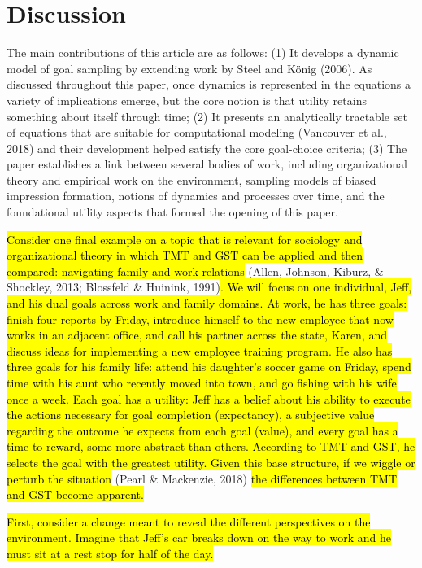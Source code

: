\documentclass[english,,man]{apa6}
\theoremstyle{definition}
\theoremstyle{definition}
\theoremstyle{definition}
\theoremstyle{remark}
\begin{document}
\hypertarget{discussion}{%
\section{Discussion}\label{discussion}}

The main contributions of this article are as follows: (1) It develops a
dynamic model of goal sampling by extending work by Steel and König
(2006). As discussed throughout this paper, once dynamics is represented
in the equations a variety of implications emerge, but the core notion
is that utility retains something about itself through time; (2) It
presents an analytically tractable set of equations that are suitable
for computational modeling (Vancouver et al., 2018) and their
development helped satisfy the core goal-choice criteria; (3) The paper
establishes a link between several bodies of work, including
organizational theory and empirical work on the environment, sampling
models of biased impression formation, notions of dynamics and processes
over time, and the foundational utility aspects that formed the opening
of this paper.

\hl{Consider one final example on a topic that is relevant for sociology and organizational theory in which TMT and GST can be applied and then compared: navigating family and work relations}
(Allen, Johnson, Kiburz, \& Shockley, 2013; Blossfeld \& Huinink,
1991)\hl{. We will focus on one individual, Jeff, and his dual goals across work and family domains. At work, he has three goals: finish four reports by Friday, introduce himself to the new employee that now works in an adjacent office, and call his partner across the state, Karen, and discuss ideas for implementing a new employee training program. He also has three goals for his family life: attend his daughter's soccer game on Friday, spend time with his aunt who recently moved into town, and go fishing with his wife once a week. Each goal has a utility: Jeff has a belief about his ability to execute the actions necessary for goal completion (expectancy), a subjective value regarding the outcome he expects from each goal (value), and every goal has a time to reward, some more abstract than others. According to TMT and GST, he selects the goal with the greatest utility. Given this base structure, if we wiggle or perturb the situation }(Pearl
\& Mackenzie,
2018)\hl{ the differences between TMT and GST become apparent.}

\hl{First, consider a change meant to reveal the different perspectives on the environment. Imagine that Jeff's car breaks down on the way to work and he must sit at a rest stop for half of the day.}
\end{document}
